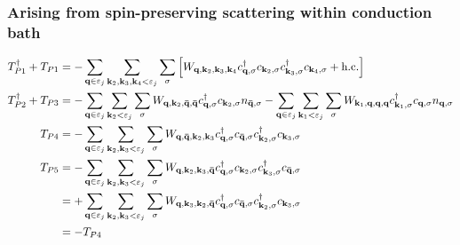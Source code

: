 \documentclass[reprint,hidelinks,onecolumn]{revtex4-2}
\begin{document}
\subsubsection*{Arising from spin-preserving scattering within conduction bath}
\begin{equation}\begin{aligned}
	T_{P1}^\dagger + T_{P1} &= -\sum_{{\bf q} \in \varepsilon_j}\sum_{{\bf k}_2, {\bf k}_3, {\bf k}_4 < \varepsilon_j}\sum_{\sigma} \left[W_{{\bf q},{\bf k}_2,{\bf k}_3,{\bf k}_4}c^\dagger_{{\bf q},\sigma}c_{{\bf k}_2,\sigma}c^\dagger_{{\bf k}_3,\sigma}c_{{\bf k}_4,\sigma} + \text{h.c.}\right]\\
	T_{P2}^\dagger + T_{P3} &= -\sum_{{\bf q} \in \varepsilon_j}\sum_{{\bf k}_2 < \varepsilon_j}\sum_{\sigma} W_{{\bf q},{\bf k}_2,{\bf \bar q}, {\bf \bar q}} c^\dagger_{{\bf q},\sigma}c_{{\bf k}_2,\sigma} n_{{\bf \bar q},\sigma} -\sum_{{\bf q} \in \varepsilon_j}\sum_{{\bf k}_1 < \varepsilon_j}\sum_{\sigma} W_{{\bf k}_1,{\bf q},{\bf q},{\bf q}} c^\dagger_{{\bf k}_1,\sigma}c_{{\bf q},\sigma} n_{{\bf q},\sigma}\\
	T_{P4} &= -\sum_{{\bf q} \in \varepsilon_j}\sum_{{\bf k}_2, {\bf k}_3 < \varepsilon_j}\sum_{\sigma}W_{{\bf q},{\bf \bar q},{\bf k}_2,{\bf k}_3} c^\dagger_{{\bf q},\sigma}c_{{\bf \bar q},\sigma}c^\dagger_{{\bf k}_2,\sigma}c_{{\bf k}_3,\sigma}\\
	T_{P5} &= -\sum_{{\bf q} \in \varepsilon_j}\sum_{{\bf k}_2, {\bf k}_3 < \varepsilon_j}\sum_{\sigma} W_{{\bf q},{\bf k}_2,{\bf k}_3,{\bf \bar q}} c^\dagger_{{\bf q},\sigma}c_{{\bf k}_2,\sigma}c^\dagger_{{\bf k}_3,\sigma}c_{{\bf \bar q},\sigma}\\
		   &= +\sum_{{\bf q} \in \varepsilon_j}\sum_{{\bf k}_2, {\bf k}_3 < \varepsilon_j}\sum_{\sigma} W_{{\bf q},{\bf k}_3,{\bf k}_2,{\bf \bar q}} c^\dagger_{{\bf q},\sigma}c_{{\bf \bar q},\sigma}c^\dagger_{{\bf k}_2,\sigma}c_{{\bf k}_3,\sigma}\\
		   &= -T_{P4}
\end{aligned}\end{equation}
\end{document}
